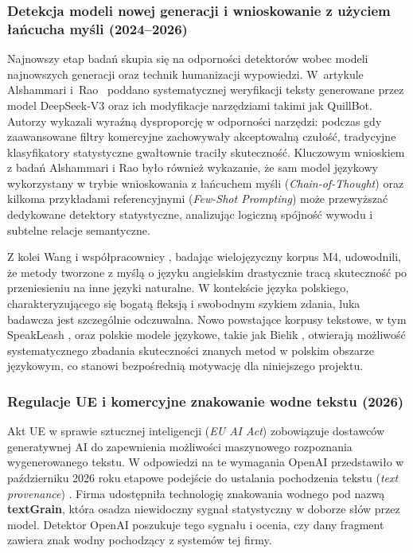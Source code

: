 \subsubsection{Detekcja modeli nowej generacji i wnioskowanie z użyciem łańcucha myśli (2024--2026)}

Najnowszy etap badań skupia się na odporności detektorów wobec modeli najnowszych generacji oraz technik humanizacji wypowiedzi. W~artykule Alshammari i~Rao~\cite{alshammari2025evaluating} poddano systematycznej weryfikacji teksty generowane przez model DeepSeek-V3 oraz ich modyfikacje narzędziami takimi jak QuillBot. Autorzy wykazali wyraźną dysproporcję w odporności narzędzi: podczas gdy zaawansowane filtry komercyjne zachowywały akceptowalną czułość, tradycyjne klasyfikatory statystyczne gwałtownie traciły skuteczność. Kluczowym wnioskiem z badań Alshammari i Rao było również wykazanie, że sam model językowy wykorzystany w trybie wnioskowania z łańcuchem myśli (\textit{Chain-of-Thought}) oraz kilkoma przykładami referencyjnymi (\textit{Few-Shot Prompting}) może przewyższać dedykowane detektory statystyczne, analizując logiczną spójność wywodu i subtelne relacje semantyczne.

Z kolei Wang i współpracownicy \cite{wang2023m4}, badając wielojęzyczny korpus M4, udowodnili, że metody tworzone z myślą o języku angielskim drastycznie tracą skuteczność po przeniesieniu na inne języki naturalne. W kontekście języka polskiego, charakteryzującego się bogatą fleksją i swobodnym szykiem zdania, luka badawcza jest szczególnie odczuwalna. Nowo powstające korpusy tekstowe, w tym SpeakLeash \cite{speakleash2024}, oraz polskie modele językowe, takie jak Bielik \cite{bielik2024}, otwierają możliwość systematycznego zbadania skuteczności znanych metod w polskim obszarze językowym, co stanowi bezpośrednią motywację dla niniejszego projektu.

\subsubsection{Regulacje UE i komercyjne znakowanie wodne tekstu (2026)}

Akt UE w sprawie sztucznej inteligencji (\textit{EU AI Act}) zobowiązuje dostawców generatywnej AI do zapewnienia możliwości maszynowego rozpoznania wygenerowanego tekstu. W odpowiedzi na te wymagania OpenAI przedstawiło w październiku 2026 roku etapowe podejście do ustalania pochodzenia tekstu (\textit{text provenance}) \cite{openai2026textprovenance}. Firma udostępniła technologię znakowania wodnego pod nazwą \textbf{textGrain}, która osadza niewidoczny sygnał statystyczny w doborze słów przez model. Detektor OpenAI poszukuje tego sygnału i ocenia, czy dany fragment zawiera znak wodny pochodzący z systemów tej firmy.

